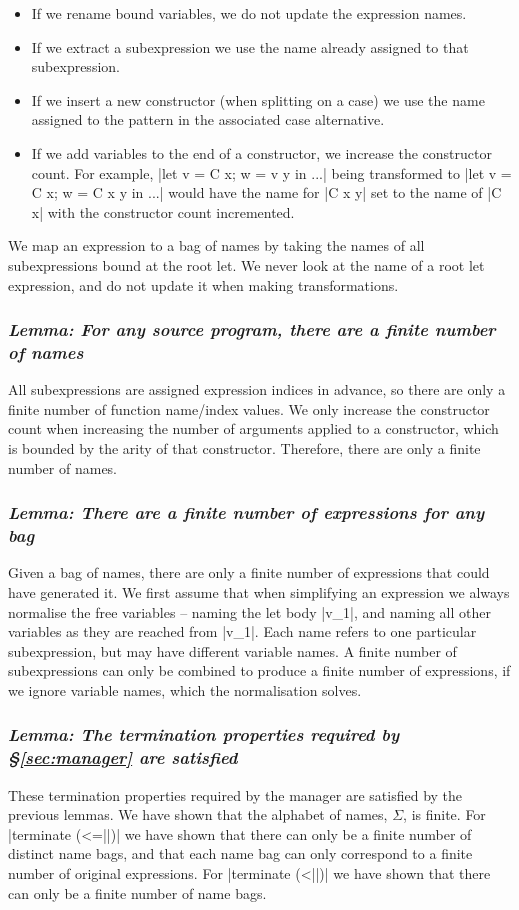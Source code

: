 \documentclass[draft]{sigplanconf}
\newcommand{\lemma}[1]{\subsubsection*{\textit{Lemma: #1}}}
\begin{document}
\begin{itemize}
\item If we rename bound variables, we do not update the expression names.
\item If we extract a subexpression we use the name already assigned to that subexpression.
\item If we insert a new constructor (when splitting on a case) we use the name assigned to the pattern in the associated case alternative.
\item If we add variables to the end of a constructor, we increase the constructor count. For example, |let v = C x; w = v y in ...| being transformed to |let v = C x; w = C x y in ...| would have the name for |C x y| set to the name of |C x| with the constructor count incremented.
\end{itemize}

We map an expression to a bag of names by taking the names of all subexpressions bound at the root let. We never look at the name of a root let expression, and do not update it when making transformations.

\lemma{For any source program, there are a finite number of names}

All subexpressions are assigned expression indices in advance, so there are only a finite number of function name/index values. We only increase the constructor count when increasing the number of arguments applied to a constructor, which is bounded by the arity of that constructor. Therefore, there are only a finite number of names.

\lemma{There are a finite number of expressions for any bag}

Given a bag of names, there are only a finite number of expressions that could have generated it. We first assume that when simplifying an expression we always normalise the free variables -- naming the let body |v_1|, and naming all other variables as they are reached from |v_1|. Each name refers to one particular subexpression, but may have different variable names. A finite number of subexpressions can only be combined to produce a finite number of expressions, if we ignore variable names, which the normalisation solves.

\lemma{The termination properties required by \S\ref{sec:manager} are satisfied}

These termination properties required by the manager are satisfied by the previous lemmas. We have shown that the alphabet of names, $\Sigma$, is finite. For |terminate (<=||)| we have shown that there can only be a finite number of distinct name bags, and that each name bag can only correspond to a finite number of original expressions. For |terminate (<||)| we have shown that there can only be a finite number of name bags.
\end{document}
